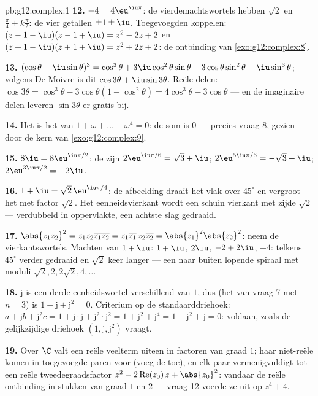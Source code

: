 \begin{solution}{pb:g12:complex:1}
\textbf{12.} $-4 = 4\eu^{\iu\pi}$: de vierdemachtswortels hebben 
$\sqrt2$ en  $\frac{\pi}{4} + k\frac{\pi}{2}$: de vier getallen
$\pm 1 \pm \iu$. Toegevoegden koppelen:
$(z - 1 - \iu)(z - 1 + \iu) = z^2 - 2z + 2$ en
$(z + 1 - \iu)(z + 1 + \iu) = z^2 + 2z + 2$: de ontbinding van
\cref{exo:g12:complex:8}.

\textbf{13.} $(\cos\theta + \iu\sin\theta)^3 = \cos^3\theta +
3\iu\cos^2\theta\sin\theta - 3\cos\theta\sin^2\theta - \iu\sin^3\theta$;
volgens De Moivre is dit $\cos 3\theta + \iu \sin 3\theta$. Reële delen:
$\cos 3\theta = \cos^3\theta - 3\cos\theta(1 - \cos^2\theta)
= 4\cos^3\theta - 3\cos\theta$ --- en de imaginaire delen leveren
$\sin 3\theta$ er gratis bij.

\textbf{14.} Het is het  van $1 + \omega + \dots + \omega^4 = 0$: de
som is $0$ --- precies vraag 8, gezien door de kern van
\cref{exo:g12:complex:9}.

\textbf{15.} $8\iu = 8\eu^{\iu\pi/2}$: de  zijn
$2\eu^{\iu\pi/6} = \sqrt3 + \iu$; $2\eu^{5\iu\pi/6} = -\sqrt3 + \iu$;
$2\eu^{3\iu\pi/2} = -2\iu$.

\textbf{16.} $1 + \iu = \sqrt2\,\eu^{\iu\pi/4}$: de afbeelding draait het vlak
over $45^\circ$ en vergroot het met factor $\sqrt2$. Het eenheidsvierkant
wordt een schuin vierkant met zijde $\sqrt2$ --- verdubbeld in oppervlakte,
een achtste slag gedraaid.

\textbf{17.} $\abs{z_1 z_2}^2 = z_1 z_2 \overline{z_1 z_2} =
z_1\overline{z_1}\, z_2\overline{z_2} = \abs{z_1}^2\abs{z_2}^2$: neem de
vierkantswortels. Machten van $1 + \iu$: $1 + \iu$, $2\iu$, $-2 + 2\iu$, $-4$:
telkens $45^\circ$ verder gedraaid en $\sqrt2$ keer langer --- een
naar buiten lopende spiraal met moduli $\sqrt2, 2, 2\sqrt2, 4, \dots$

\textbf{18.} $\mathrm{j}$ is een derde eenheidswortel verschillend van $1$,
dus (het  van vraag 7 met $n = 3$) is
$1 + \mathrm{j} + \mathrm{j}^2 = 0$. Criterium op de standaarddriehoek:
$a + \mathrm{j}b + \mathrm{j}^2 c = 1 + \mathrm{j}\cdot\mathrm{j} +
\mathrm{j}^2 \cdot \mathrm{j}^2 = 1 + \mathrm{j}^2 + \mathrm{j}^4 =
1 + \mathrm{j}^2 + \mathrm{j} = 0$: voldaan, zoals de gelijkzijdige driehoek
$\left(1, \mathrm{j}, \mathrm{j}^2\right)$ vraagt.

\textbf{19.} Over $\C$ valt een reële veelterm uiteen in factoren van graad
$1$; haar niet-reële  komen in toegevoegde paren voor (voeg de
 toe), en elk paar vermenigvuldigt tot een reële
tweedegraadsfactor $z^2 - 2\operatorname{Re}(z_0)\,z + \abs{z_0}^2$: vandaar
de reële ontbinding in stukken van graad $1$ en $2$ --- vraag 12 voerde ze uit
op $z^4 + 4$.


\end{solution}
